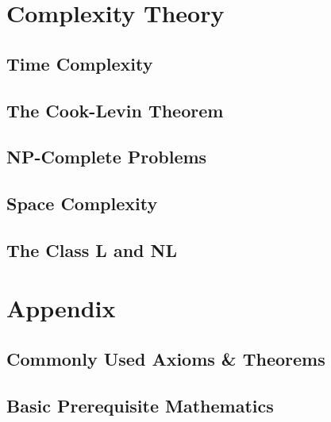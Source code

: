 \documentclass[11pt,fleqn,dvipsnames]{book} %
\begin{document}
\part{Complexity Theory}

\chapter{Time Complexity}


\chapter{The Cook-Levin Theorem}


\chapter{NP-Complete Problems}


\chapter{Space Complexity}


\chapter{The Class L and NL}


\part*{Appendix}
\appendix
\chapter*{Commonly Used Axioms \& Theorems}

\renewcommand{\leftmark}{\sffamily\bfseries Axioms \& Theorems}
\renewcommand{\rightmark}{\sffamily\bfseries Axioms \& Theorems}



\chapter*{Basic Prerequisite Mathematics}

\end{document}
